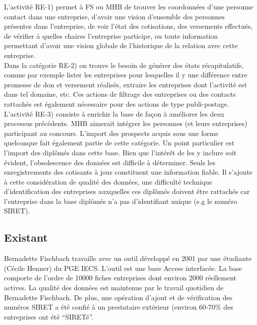\documentclass{book}
\begin{document}
\bigskip

L'activité RE-1) permet à FS ou MHB de trouver les coordonnées d'une personne
contact dans une entreprise, d'avoir une vision d'ensemble des personnes 
présentes dans l'entreprise, de voir l'état des cotisations, des versements
effectués, de vérifier à quelles chaires l'entreprise participe, ou toute
information permettant d'avoir une vision globale de l'historique de la 
relation avec cette entreprise.\\

Dans la catégorie RE-2) on trouve le besoin de générer des états récapitulatifs,
comme par exemple lister les entreprises pour lesquelles il y une différence
entre promesse de don et versement réalisés, extraire les entreprises dont 
l'activité est dans tel domaine, etc. Ces actions de filtrage des entreprises
ou des contacts rattachés est également nécessaire pour des actions de 
type publi-postage.\\

L'activité RE-3) consiste à enrichir la base de façon à améliorer les deux
processus précédents. MHB aimerait intégrer les personnes (et leurs entreprises)
participant au concours. L'import des prospects acquis sous une forme quelconque
fait également partie de cette catégorie.
Un point particulier est l'import des diplômés dans cette base. Bien que l'intérêt 
de les y inclure soit évident, l'obsolescence des données est difficile à déterminer.
Seuls les enregistrements des cotisants à jour constituent une information fiable.
Il s'ajoute à cette considération de qualité des données, une difficulté technique
d'identification des entreprises auxquelles ces diplômés doivent être rattachés car
l'entreprise dans la base diplômés n'a pas d'identifiant unique (e.g le numéro SIRET).



\subsection{Existant}

Bernadette Fischbach travaille avec un outil développé en 2001 par 
une étudiante (Cécile Henner) du PGE IECS. L'outil est une base 
Access interfacée. La base comporte de l'ordre de 10000 fiches 
entreprises dont environ 2000 réellement actives. La qualité
des données est maintenue par le travail quotidien de Bernadette
Fischbach. De plus, une opération d'ajout et de vérification des
numéros SIRET a été confié à un prestataire extérieur (environ
60-70\% des entreprises ont été ``SIRETé''.\\
\end{document}
